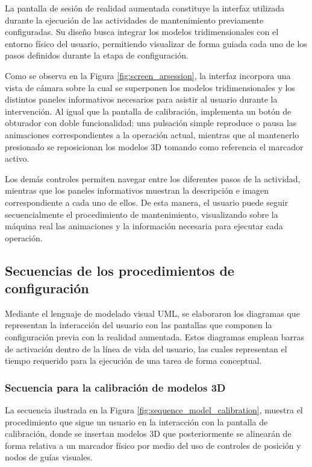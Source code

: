            La pantalla de sesión de realidad aumentada constituye la interfaz utilizada durante la ejecución de las actividades de mantenimiento previamente configuradas. Su diseño busca integrar los modelos tridimensionales con el entorno físico del usuario, permitiendo visualizar de forma guiada cada uno de los pasos definidos durante la etapa de configuración.

            

            Como se observa en la Figura \ref{fig:screen_arsession}, la interfaz incorpora una vista de cámara sobre la cual se superponen los modelos tridimensionales y los distintos paneles informativos necesarios para asistir al usuario durante la intervención. Al igual que la pantalla de calibración, implementa un botón de obturador con doble funcionalidad: una pulsación simple reproduce o pausa las animaciones correspondientes a la operación actual, mientras que al mantenerlo presionado se reposicionan los modelos 3D tomando como referencia el marcador activo.

            Los demás controles permiten navegar entre los diferentes pasos de la actividad, mientras que los paneles informativos muestran la descripción e imagen correspondiente a cada uno de ellos. De esta manera, el usuario puede seguir secuencialmente el procedimiento de mantenimiento, visualizando sobre la máquina real las animaciones y la información necesaria para ejecutar cada operación.

    \subsection{Secuencias de los procedimientos de configuración}

        Mediante el lenguaje de modelado visual UML, se elaboraron los diagramas que representan la interacción del usuario con las pantallas que componen la configuración previa con la realidad aumentada. Estos diagramas emplean barras de activación dentro de la línea de vida del usuario, las cuales representan el tiempo requerido para la ejecución de una tarea de forma conceptual.

        \subsubsection{Secuencia para la calibración de modelos 3D}

            La secuencia ilustrada en la Figura \ref{fig:sequence_model_calibration}, muestra el procedimiento que sigue un usuario en la interacción con la pantalla de calibración, donde se insertan modelos 3D que posteriormente se alinearán de forma relativa a un marcador físico por medio del uso de controles de posición y nodos de guías visuales. 

